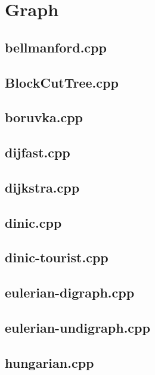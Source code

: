 \section{Graph}

\subsection{bellmanford.cpp}


\subsection{BlockCutTree.cpp}


\subsection{boruvka.cpp}


\subsection{dijfast.cpp}


\subsection{dijkstra.cpp}


\subsection{dinic.cpp}


\subsection{dinic-tourist.cpp}


\subsection{eulerian-digraph.cpp}


\subsection{eulerian-undigraph.cpp}


\subsection{hungarian.cpp}


